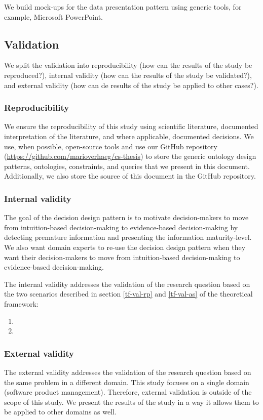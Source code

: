 We build mock-ups for the data presentation pattern using generic tools, for example, Microsoft PowerPoint.  

\subsection{Validation} \label{meth-validation}
We split the validation into reproducibility (how can the results of the study be reproduced?), internal validity (how can the results of the study be validated?), and external validity (how can de results of the study be applied to other cases?).

\subsubsection{Reproducibility}
We ensure the reproducibility of this study using scientific literature, documented interpretation of the literature, and where applicable, documented decisions. We use, when possible, open-source tools and use our GitHub repository (\href{https://github.com/marioverhaeg/cs-thesis}{https://github.com/marioverhaeg/cs-thesis}) to store the generic ontology design patterns, ontologies, constraints, and queries that we present in this document. Additionally, we also store the source of this document in the GitHub repository.

\subsubsection{Internal validity}
The goal of the decision design pattern is to motivate decision-makers to move from intuition-based decision-making to evidence-based decision-making by detecting premature information and presenting the information maturity-level. We also want domain experts to re-use the decision design pattern when they want their decision-makers to move from intuition-based decision-making to evidence-based decision-making. 

The internal validity addresses the validation of the research question based on the two scenarios described in section \ref{tf-val-rp}  and \ref{tf-val-as}  of the theoretical framework:
\begin{enumerate}
\item {}
\item {}
\end{enumerate}

\subsubsection{External validity}
The external validity addresses the validation of the research question based on the same problem in a different domain. This study focuses on a single domain (software product management). Therefore, external validation is outside of the scope of this study. We present the results of the study in a way it allows them to be applied to other domains as well.

